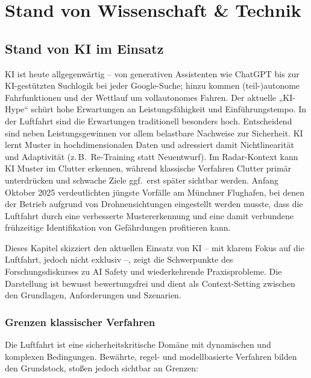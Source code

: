 \part{Stand von Wissenschaft \& Technik}
\chapter{Stand von KI im Einsatz}\label{chap:state-of-practice}
KI ist heute allgegenwärtig – von generativen Assistenten wie ChatGPT bis zur KI-gestützten Suchlogik bei jeder Google-Suche; 
hinzu kommen (teil-)autonome Fahrfunktionen und der Wettlauf um vollautonomes Fahren. Der aktuelle „KI-Hype“ schürt hohe 
Erwartungen an Leistungsfähigkeit und Einführungs­tempo. In der Luftfahrt sind die Erwartungen traditionell besonders hoch. 
Entscheidend sind neben Leistungsgewinnen vor allem belastbare Nachweise zur Sicherheit. 
KI lernt Muster in hochdimensionalen Daten und adressiert damit Nichtlinearität und Adaptivität 
(z.\,B.\ Re-Training statt Neuentwurf). Im Radar-Kontext kann KI Muster im Clutter erkennen, 
während klassische Verfahren Clutter primär unterdrücken und schwache Ziele ggf.\ erst später sichtbar werden. 
Anfang Oktober 2025 verdeutlichten jüngste Vorfälle am Münchner Flughafen, bei denen der Betrieb aufgrund von 
Drohnensichtungen eingestellt werden musste, dass die Luftfahrt durch eine verbesserte Mustererkennung 
und eine damit verbundene frühzeitige Identifikation von Gefährdungen profitieren kann.

\medskip
Dieses Kapitel skizziert den aktuellen Einsatz von KI – mit klarem Fokus auf die Luftfahrt, jedoch nicht exklusiv –,
zeigt die Schwerpunkte des Forschungsdiskurses zu AI Safety und wiederkehrende Praxisprobleme.
Die Darstellung ist bewusst bewertungsfrei und dient als Context-Setting zwischen den
Grundlagen, Anforderungen und Szenarien.


\section{Grenzen klassischer Verfahren}\label{sec:motivation-classic-limits}
Die Luftfahrt ist eine sicherheitskritische Domäne mit dynamischen und komplexen Bedingungen. Bewährte, regel- und modellbasierte Verfahren
bilden den Grundstock, stoßen jedoch sichtbar an Grenzen:

